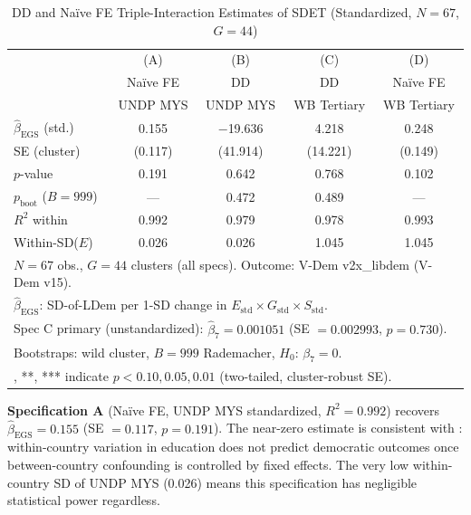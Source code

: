 \documentclass[11pt,letterpaper]{article}
\begin{document}
\begin{table}[!htbp]
  \centering
  \caption{DD and Na\"{i}ve FE Triple-Interaction Estimates of SDET (Standardized, $N=67$, $G=44$)}
  \label{tab:main}
  \begin{tabular}{lcccc}
    \toprule
     & (A) & (B) & (C) & (D) \\
     & Na\"{i}ve FE & DD & DD & Na\"{i}ve FE \\
     & UNDP MYS & UNDP MYS & WB Tertiary & WB Tertiary \\
    \midrule
    $\hat{\beta}_\text{EGS}$ (std.) & 0.155 & $-$19.636 & 4.218 & 0.248 \\
    SE (cluster) & (0.117) & (41.914) & (14.221) & (0.149) \\
    $p$-value & 0.191 & 0.642 & 0.768 & 0.102 \\
    $p_\text{boot}$ ($B=999$) & --- & 0.472 & 0.489 & --- \\
    $R^2$ within & 0.992 & 0.979 & 0.978 & 0.993 \\
    Within-SD($E$) & 0.026 & 0.026 & 1.045 & 1.045 \\
    \bottomrule
    \multicolumn{5}{l}{\small $N = 67$ obs., $G = 44$ clusters (all specs). Outcome: V-Dem v2x\_libdem (V-Dem v15).} \\
    \multicolumn{5}{l}{\small $\hat{\beta}_\text{EGS}$: SD-of-LDem per 1-SD change in $E_\text{std} \times G_\text{std} \times S_\text{std}$.} \\
    \multicolumn{5}{l}{\small Spec C primary (unstandardized): $\hat{\beta}_7 = 0.001051$ (SE $= 0.002993$, $p = 0.730$).} \\
    \multicolumn{5}{l}{\small Bootstraps: \citealt{Cameron2008} wild cluster, $B=999$ Rademacher, $H_0$: $\beta_7 = 0$.} \\
    \multicolumn{5}{l}{\small *, **, *** indicate $p < 0.10, 0.05, 0.01$ (two-tailed, cluster-robust SE).} \\
  \end{tabular}
\end{table}

\textbf{Specification A} (Na\"{i}ve FE, UNDP MYS standardized, $R^2 = 0.992$) recovers
$\hat{\beta}_\text{EGS} = 0.155$ (SE $= 0.117$, $p = 0.191$). The near-zero estimate is consistent
with \citet{Acemoglu2008}: within-country variation in education does not predict democratic
outcomes once between-country confounding is controlled by fixed effects. The very low within-country
SD of UNDP MYS (0.026) means this specification has negligible statistical power regardless.
\end{document}
